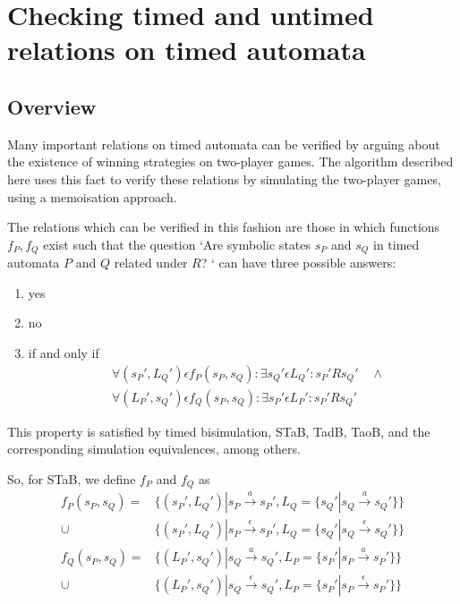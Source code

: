 \section{Checking timed and untimed relations on timed automata}

\subsection{Overview}

Many important relations on timed automata can be verified by arguing
about the existence of winning strategies on two-player games. The
algorithm described here uses this fact to verify these relations
by simulating the two-player games, using a memoisation approach.

The relations which can be verified in this fashion are those in which
functions $f_P, f_Q$ exist such that
the question `Are symbolic states $s_P$ and $s_Q$ in timed automata $P$ and $Q$
related under $R$? ` can have three possible answers:
\begin{enumerate}
\item yes
\item no
\item if and only if 
  \begin{align*} 
    &\forall (s_P', L_Q') \epsilon f_P(s_P, s_Q): \exists s_Q' \epsilon
    L_Q': s_P' R s_Q' \quad \wedge \\
    &\forall (L_P', s_Q') \epsilon f_Q(s_P, s_Q): \exists s_P' \epsilon
    L_P': s_P' R s_Q'
  \end{align*} 
\end{enumerate}

This property is satisfied by timed bisimulation, STaB, TadB, TaoB,
and the corresponding simulation equivalences, among others.

So, for STaB, we define $f_P$ and $f_Q$ as
\begin{align*}
  f_P(s_P, s_Q) = & \{(s_P', L_Q') | s_P \xrightarrow{a} s_P', 
  L_Q=\{ s_Q' | s_Q \xrightarrow{a} s_Q'\}\} \\
  \cup & \{(s_P', L_Q') | s_P \xrightarrow{\epsilon} s_P', 
  L_Q=\{ s_Q' | s_Q \xrightarrow{\epsilon} s_Q'\}\} \\
  f_Q(s_P, s_Q) = & \{(L_P', s_Q') | s_Q \xrightarrow{a} s_Q', 
  L_P=\{ s_P' | s_P \xrightarrow{a} s_P'\}\} \\
  \cup & \{(L_P', s_Q') | s_Q \xrightarrow{\epsilon} s_Q', 
  L_P=\{ s_P' | s_P \xrightarrow{\epsilon} s_P'\}\} 
\end{align*}

